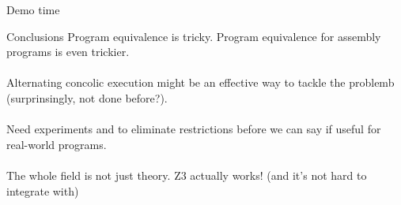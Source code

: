 \documentclass[pdf]{beamer}
\begin{document}
\begin{frame}
Demo time
\end{frame}

\begin{frame}{Conclusions}
Program equivalence is tricky. Program equivalence for assembly programs is even trickier. \\~\\
\pause
Alternating concolic execution might be an effective way to tackle the problemb (surprinsingly, not done before?). \\~\\
\pause
Need experiments and to eliminate restrictions before we can say if useful for real-world programs. \\~\\
\pause
The whole field is not just theory. Z3 actually works! (and it's not hard to integrate with) \\
\end{frame}
\end{document}
